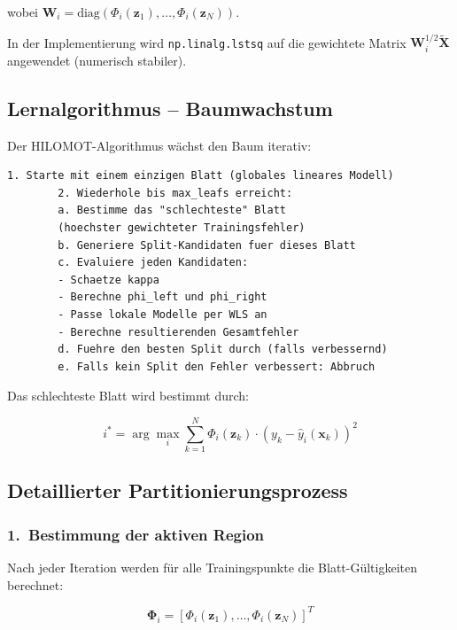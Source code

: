 \documentclass[11pt,a4paper]{report}
\begin{document}
	wobei $\mathbf{W}_i = \mathrm{diag}(\Phi_i(\mathbf{z}_1), \ldots, \Phi_i(\mathbf{z}_N))$.
	
	In der Implementierung wird \texttt{np.linalg.lstsq} auf die gewichtete Matrix $\mathbf{W}_i^{1/2} \tilde{\mathbf{X}}$ angewendet (numerisch stabiler).
	
	\subsection{Lernalgorithmus -- Baumwachstum}
	
	Der HILOMOT-Algorithmus wächst den Baum iterativ:
	
	\begin{lstlisting}[caption={HILOMOT-Lernalgorithmus (Pseudocode)},language={}
		]
		1. Starte mit einem einzigen Blatt (globales lineares Modell)
		2. Wiederhole bis max_leafs erreicht:
		a. Bestimme das "schlechteste" Blatt
		(hoechster gewichteter Trainingsfehler)
		b. Generiere Split-Kandidaten fuer dieses Blatt
		c. Evaluiere jeden Kandidaten:
		- Schaetze kappa
		- Berechne phi_left und phi_right
		- Passe lokale Modelle per WLS an
		- Berechne resultierenden Gesamtfehler
		d. Fuehre den besten Split durch (falls verbessernd)
		e. Falls kein Split den Fehler verbessert: Abbruch
	\end{lstlisting}
	
	Das schlechteste Blatt wird bestimmt durch:
	
	\begin{equation}
		i^* = \arg\max_i \sum_{k=1}^{N} \Phi_i(\mathbf{z}_k) \cdot \left(y_k - \hat{y}_i(\mathbf{x}_k)\right)^2
	\end{equation}
	
	\subsection{Detaillierter Partitionierungsprozess}
	
	\subsubsection*{1.~Bestimmung der aktiven Region}
	
	Nach jeder Iteration werden für alle Trainingspunkte die Blatt-Gültigkeiten berechnet:
	
	\begin{equation}
		\boldsymbol{\Phi}_i = [\Phi_i(\mathbf{z}_1), \ldots, \Phi_i(\mathbf{z}_N)]^T
	\end{equation}
	
\end{document}
